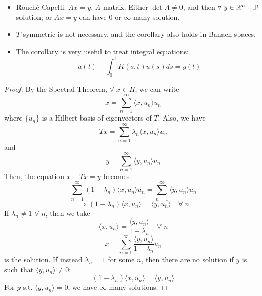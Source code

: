 \begin{remark}
    \begin{itemize}
        \item Rouché Capelli: \(Ax = y\). \(A\) matrix. Either \(\det A \neq 0\), and then \(\forall\; y \in \mathbb{R}^n \quad \exists!\; \) solution; or \(Ax = y\) can have \(0\) or \(\infty \) many solution.
        \item \(T\) symmetric is not necessary, and the corollary also holds in Banach spaces. 
        \item The corollary is very useful to treat integral equations:
        \[
            u(t) - \int_0^1 K(s, t) u(s) ds = g(t)
        \]
    \end{itemize}
\end{remark}
\begin{proof}
    By the Spectral Theorem, \(\forall \; x \in H\), we can write 
    \[
        x = \sum_{n=1}^\infty \langle x, u_n\rangle u_n
    \] 
    where \(\{u_n \}\) is a Hilbert basis of eigenvectors of \(T\). Also, we have 
    \[
        Tx = \sum_{n=1}^\infty \lambda_n \langle x, u_n\rangle u_n
    \]
    and 
    \[
        y = \sum_{n=1}^\infty \langle y, u_n\rangle u_n
    \]
    Then, the equation \(x - Tx = y\) becomes
    \[
        \sum_{n=1}^\infty (1- \lambda_n) \langle x, u_n\rangle u_n = \sum_{n=1}^\infty \langle y, u_n \rangle u_n
    \]
    \[
        \Rightarrow (1 - \lambda_n) \langle x, u_n\rangle = \langle y, u_n\rangle \quad \forall\; n
    \]
    If \(\lambda_n \neq 1\) \(\forall \; n\), then we take 
    \[
        \langle x, u_n\rangle = \frac{\langle y, u_n \rangle}{1 - \lambda_n} \quad \forall\; n
    \]
    \[
        x = \sum_{n=1}^\infty \frac{\langle y, u_n\rangle}{1 - \lambda_n} u_n
    \]
    is the solution. If instead \(\lambda_n = 1\) for some \(n\), then there are no solution if \(y\) is such that \(\langle y, u_n\rangle \neq 0\):
    \[
        (1 - \lambda_n) \langle x, u_n\rangle = \langle y, u_n\rangle
    \]
    For \(y\) s.t. \(\langle y, u_n\rangle = 0\), we have \(\infty\) many solutions.
\end{proof}